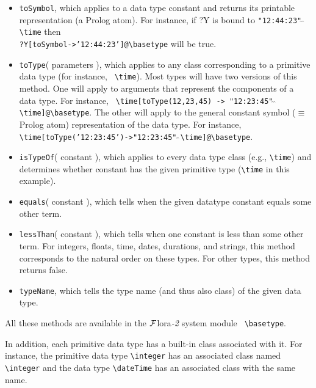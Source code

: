 \documentclass[11pt]{article}
\newcommand{\FLORA}{{\mbox{\sc ${\cal F}${lora}\rm\emph{-2}}}\xspace}
\newcommand{\FLSYSTEM}{\FLORA}
\newcommand{\bs}{\textbackslash}
\begin{document}
 \begin{itemize}
    \item {\tt toSymbol}, which applies to a data type constant and
      returns its printable representation (a Prolog atom). For instance, if ?Y is bound to
      {\tt "12:44:23"$\hat{~}\hat{~}$\bs{}time} then \\
      {\tt ?Y[toSymbol->'12:44:23']@\bs{}basetype} will
      be true.
    \item {\tt toType}( parameters ), which applies to any class
      corresponding to a primitive data type (for instance, {\tt
        \bs{}time}). Most types will have two versions of this method. One
      will apply to arguments that represent the components of a data
      type. For instance, {\tt
        \bs{}time[toType(12,23,45) ->
        "12:23:45"$\hat{~}\hat{~}$\bs{}time]@\bs{}basetype}.  The other will
      apply to the general constant symbol ($\equiv$ Prolog atom)
      representation of the data type. For instance,
      {\tt
        \bs{}time[toType('12:23:45')->"12:23:45"$\hat{~}\hat{~}$\bs{}time]@\bs{}basetype}. 
    \item {\tt isTypeOf}( constant ), which applies to every data type
      class (e.g., {\tt \bs{}time}) and determines whether constant has the
      given primitive type ({\tt \bs{}time} in this example).
    \item {\tt equals}( constant ), which tells when the given datatype constant equals some other term.
    \item {\tt lessThan}( constant ), which tells when one constant is
      less than some other term. For integers, floats, time, dates,
      durations, and strings, this method corresponds to the natural order
      on these types. For other types, this method returns false.
    \item {\tt typeName}, which tells the type name (and thus also class)
      of the given data type.
    \end{itemize}

    All these methods are available in the \FLSYSTEM system module {\tt
      \bs{}basetype}. 

In addition, each primitive data type has a built-in class associated with it.
For instance, the primitive data type {\tt \bs{}integer} has an associated
class  named {\tt \bs{}integer} and the data type {\tt \bs{}dateTime} has an
associated class with the same name.  
\end{document}
